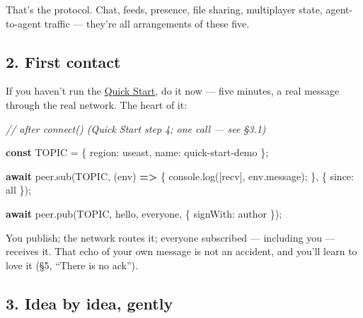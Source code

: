 \documentclass[
  nobib]{tufte-handout}
\newenvironment{Shaded}{}{}
\newcommand{\AttributeTok}[1]{\textcolor[rgb]{0.49,0.56,0.16}{#1}}
\newcommand{\BuiltInTok}[1]{\textcolor[rgb]{0.00,0.50,0.00}{#1}}
\newcommand{\CommentTok}[1]{\textcolor[rgb]{0.38,0.63,0.69}{\textit{#1}}}
\newcommand{\ControlFlowTok}[1]{\textcolor[rgb]{0.00,0.44,0.13}{\textbf{#1}}}
\newcommand{\DataTypeTok}[1]{\textcolor[rgb]{0.56,0.13,0.00}{#1}}
\newcommand{\FunctionTok}[1]{\textcolor[rgb]{0.02,0.16,0.49}{#1}}
\newcommand{\KeywordTok}[1]{\textcolor[rgb]{0.00,0.44,0.13}{\textbf{#1}}}
\newcommand{\NormalTok}[1]{#1}
\newcommand{\OperatorTok}[1]{\textcolor[rgb]{0.40,0.40,0.40}{#1}}
\newcommand{\StringTok}[1]{\textcolor[rgb]{0.25,0.44,0.63}{#1}}
\begin{document}
That's the protocol. Chat, feeds, presence, file sharing, multiplayer
state, agent-to-agent traffic --- they're all arrangements of these
five.

\subsection{2. First contact}\label{first-contact}

If you haven't run the \href{Quick-Start-v4.16.0.md}{Quick Start}, do it
now --- five minutes, a real message through the real network. The heart
of it:

\begin{Shaded}
\begin{Highlighting}[]
\CommentTok{// after connect() (Quick Start step 4; one call — see §3.1)}

\KeywordTok{const}\NormalTok{ TOPIC }\OperatorTok{=}\NormalTok{ \{ }\DataTypeTok{region}\OperatorTok{:} \StringTok{\textquotesingle{}useast\textquotesingle{}}\OperatorTok{,} \DataTypeTok{name}\OperatorTok{:} \StringTok{\textquotesingle{}quick{-}start{-}demo\textquotesingle{}}\NormalTok{ \}}\OperatorTok{;}

\ControlFlowTok{await}\NormalTok{ peer}\OperatorTok{.}\FunctionTok{sub}\NormalTok{(TOPIC}\OperatorTok{,}\NormalTok{ (env) }\KeywordTok{=\textgreater{}}\NormalTok{ \{}
  \BuiltInTok{console}\OperatorTok{.}\FunctionTok{log}\NormalTok{(}\StringTok{\textquotesingle{}[recv]\textquotesingle{}}\OperatorTok{,}\NormalTok{ env}\OperatorTok{.}\AttributeTok{message}\NormalTok{)}\OperatorTok{;}
\NormalTok{\}}\OperatorTok{,}\NormalTok{ \{ }\DataTypeTok{since}\OperatorTok{:} \StringTok{\textquotesingle{}all\textquotesingle{}}\NormalTok{ \})}\OperatorTok{;}

\ControlFlowTok{await}\NormalTok{ peer}\OperatorTok{.}\FunctionTok{pub}\NormalTok{(TOPIC}\OperatorTok{,} \StringTok{\textquotesingle{}hello, everyone\textquotesingle{}}\OperatorTok{,}\NormalTok{ \{ }\DataTypeTok{signWith}\OperatorTok{:}\NormalTok{ author \})}\OperatorTok{;}
\end{Highlighting}
\end{Shaded}

You publish; the network routes it; everyone subscribed --- including
you --- receives it. That echo of your own message is not an accident,
and you'll learn to love it (§5, ``There is no ack'').

\subsection{3. Idea by idea, gently}\label{idea-by-idea-gently}
\end{document}
